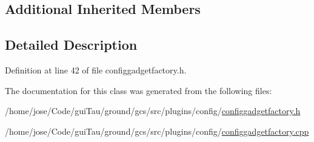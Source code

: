 \subsection*{Additional Inherited Members}


\subsection{Detailed Description}


Definition at line 42 of file configgadgetfactory.\-h.



The documentation for this class was generated from the following files\-:\begin{DoxyCompactItemize}
\item 
/home/jose/\-Code/gui\-Tau/ground/gcs/src/plugins/config/\hyperlink{configgadgetfactory_8h}{configgadgetfactory.\-h}\item 
/home/jose/\-Code/gui\-Tau/ground/gcs/src/plugins/config/\hyperlink{configgadgetfactory_8cpp}{configgadgetfactory.\-cpp}\end{DoxyCompactItemize}
